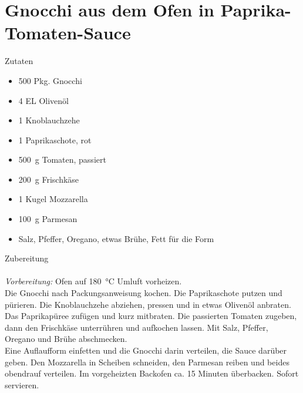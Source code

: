 \section*{Gnocchi aus dem Ofen in Paprika-Tomaten-Sauce}
\ihead{}\ohead{}
\cfoot{}
{\Large Zutaten}
\begin{multicols}{2}
\begin{itemize}
    \item \num{500} Pkg. Gnocchi
    \item \num{4} EL Olivenöl
    \item \num{1} Knoblauchzehe
    \item \num{1} Paprikaschote, rot
    \item \SI{500}{g} Tomaten, passiert
    \item \SI{200}{g} Frischkäse
    \item \num{1} Kugel Mozzarella
    \item \SI{100}{g} Parmesan
    \item Salz, Pfeffer, Oregano, etwas Brühe, Fett für die Form
\end{itemize}
\end{multicols}
\noindent
{\Large Zubereitung}\\
\\
\textit{Vorbereitung:} Ofen auf \SI{180}{\celsius} Umluft vorheizen.\\
Die Gnocchi nach Packungsanweisung kochen. 
Die Paprikaschote putzen und pürieren. 
Die Knoblauchzehe abziehen, pressen und in etwas Olivenöl anbraten.
Das Paprikapüree zufügen und kurz mitbraten. 
Die passierten Tomaten zugeben, dann den Frischkäse unterrühren und aufkochen lassen. 
Mit Salz, Pfeffer, Oregano und Brühe abschmecken.\\
Eine Auflaufform einfetten und die Gnocchi darin verteilen, die Sauce darüber geben. 
Den Mozzarella in Scheiben schneiden, den Parmesan reiben und beides obendrauf verteilen.
Im vorgeheizten Backofen ca. 15 Minuten überbacken.
Sofort servieren.
